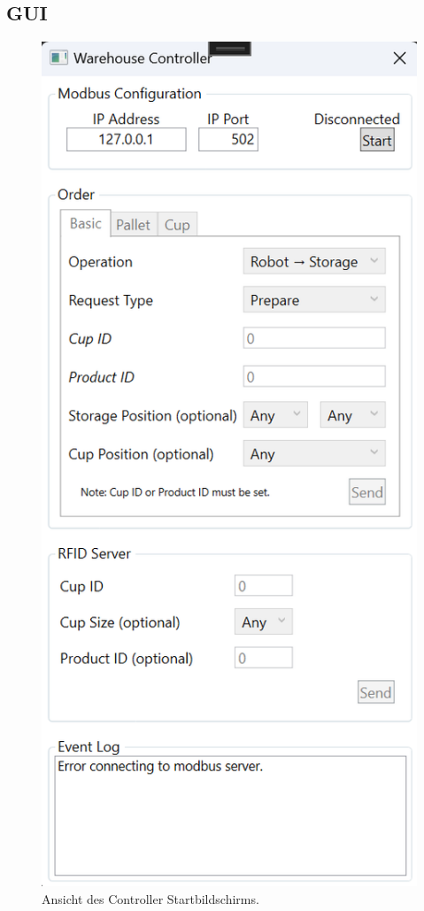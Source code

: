 \subsection{GUI}

\begin{figure}
    \caption[Ansicht des Controller- Startbildschirm ]
    {\small Ansicht des Controller Startbildschirms. }\label{fig:figure5}
    \includegraphics[height = \textheight ]{Bilder/Controller_Startbildschirm}
    \centering
\end{figure}

